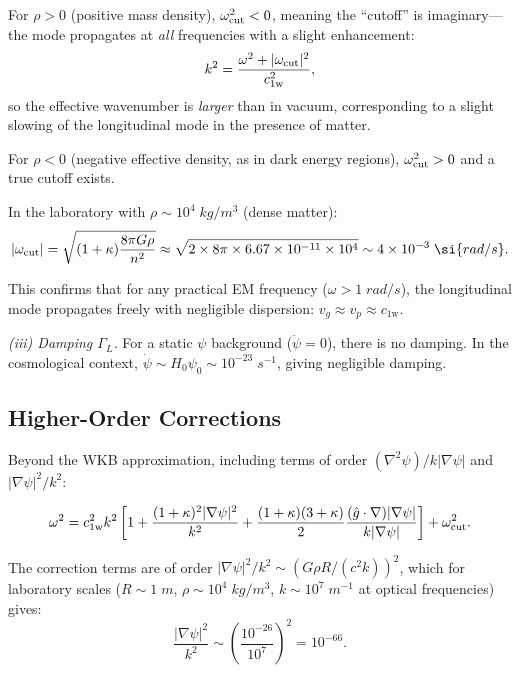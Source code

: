 \documentclass[aps,prd,twocolumn,superscriptaddress,nofootinbib,floatfix]{revtex4-2}
\newcommand{\cfield}{c_{\text{1w}}}
\newcommand{\ee}[1]{\times 10^{#1}}
\begin{document}
For $\rho > 0$ (positive mass density), $\omega_{\rm cut}^2 < 0$,
meaning the ``cutoff'' is imaginary---the mode propagates at
\emph{all} frequencies with a slight enhancement:
\begin{equation}
k^2 = \frac{\omega^2 + |\omega_{\rm cut}|^2}{\cfield^2},
\end{equation}
so the effective wavenumber is \emph{larger} than in vacuum,
corresponding to a slight slowing of the longitudinal mode
in the presence of matter.

For $\rho < 0$ (negative effective density, as in dark energy
regions), $\omega_{\rm cut}^2 > 0$ and a true cutoff exists.

In the laboratory with $\rho \sim 10^4\;\si{kg/m^3}$ (dense matter):
\begin{equation}
|\omega_{\rm cut}| = \sqrt{(1+\kappa)\frac{8\pi G\rho}{n^2}}
\approx \sqrt{2 \times 8\pi \times 6.67\ee{-11} \times 10^4}
\sim 4\ee{-3}\;\si{rad/s}.
\end{equation}

This confirms that for any practical EM frequency
($\omega > 1\;\si{rad/s}$), the longitudinal mode propagates
freely with negligible dispersion: $v_g \approx v_p \approx \cfield$.

\textit{(iii) Damping $\Gamma_L$.}
For a static $\psi$ background ($\dot\psi = 0$), there is no
damping.  In the cosmological context, $\dot\psi \sim H_0\psi_0
\sim 10^{-23}\;\si{s^{-1}}$, giving negligible damping.

\subsection{Higher-Order Corrections}

Beyond the WKB approximation, including terms of order
$(\nabla^2\psi)/k|\nabla\psi|$ and $|\nabla\psi|^2/k^2$:

\begin{equation}
\omega^2 = \cfield^2 k^2\left[1 + \frac{(1+\kappa)^2|\nabla\psi|^2}{k^2}
+ \frac{(1+\kappa)(3+\kappa)}{2}\frac{(\hat{g}\cdot\nabla)|\nabla\psi|}{k|\nabla\psi|}\right]
+ \omega_{\rm cut}^2.
\label{eq:dispersion-higher}
\end{equation}

The correction terms are of order $|\nabla\psi|^2/k^2 \sim (G\rho R/(c^2 k))^2$,
which for laboratory scales ($R \sim 1\;\si{m}$, $\rho \sim 10^4\;\si{kg/m^3}$,
$k \sim 10^7\;\si{m^{-1}}$ at optical frequencies) gives:
\begin{equation}
\frac{|\nabla\psi|^2}{k^2} \sim \left(\frac{10^{-26}}{10^7}\right)^2 = 10^{-66}.
\end{equation}
\end{document}
